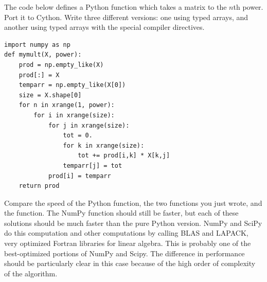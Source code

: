 \begin{problem}
The code below defines a Python function which takes a matrix to the $n$th power.
Port it to Cython.
Write three different versions: one using typed arrays, and another using typed arrays with the special compiler directives.
\begin{lstlisting}
import numpy as np
def mymult(X, power):
    prod = np.empty_like(X)
    prod[:] = X
    temparr = np.empty_like(X[0])
    size = X.shape[0]
    for n in xrange(1, power):
        for i in xrange(size):
            for j in xrange(size):
                tot = 0.
                for k in xrange(size):
                    tot += prod[i,k] * X[k,j]
                temparr[j] = tot
            prod[i] = temparr
    return prod
\end{lstlisting}

Compare the speed of the Python function, the two functions you just wrote, and the  function.
The NumPy function should still be faster, but each of these solutions should be much faster than the pure Python version.
NumPy and SciPy do this computation and other computations by calling BLAS and LAPACK, very optimized Fortran libraries for linear algebra.
This is probably one of the best-optimized portions of NumPy and Scipy.
The difference in performance should be particularly clear in this case because of the high order of complexity of the algorithm.
\end{problem}

